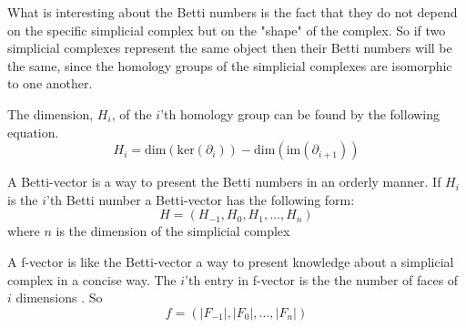 \documentclass[11pt,a4paper,twoside]{report}
\begin{document}
What is interesting about the Betti numbers is the fact that they do not depend on the  specific simplicial complex but on the "shape" of the complex. So if two simplicial complexes represent the same object then their Betti numbers will be the same, since the homology groups of the simplicial complexes are isomorphic to one another.\cite[p. 70]{Edelsbrunner} 

The dimension, $H_i$, of the $i$'th homology group can be found by the following equation. \cite[p.2]{Allgaier}
\begin{equation*}
H_i = \textrm{dim}(\textrm{ker}(\partial_i))-\textrm{dim}(\textrm{im}(\partial_{i+1}))
\end{equation*}

A Betti-vector is a way to present the Betti numbers in an orderly manner. If $H_i$ is the $i$'th Betti number a Betti-vector has the following form:
\begin{equation*}
H = (H_{-1},H_0,H_1,\dots,H_n)
\end{equation*}
where $n$ is the dimension of the simplicial complex

A f-vector is like the Betti-vector a way to present knowledge about a simplicial complex in a concise way. The $i$'th entry in f-vector is the the number of faces of $i$ dimensions \cite[p.15]{Jonsson}. So
\begin{equation*}
f = (|F_{-1}|,|F_0|,\dots,|F_n|)
\end{equation*}
\end{document}
